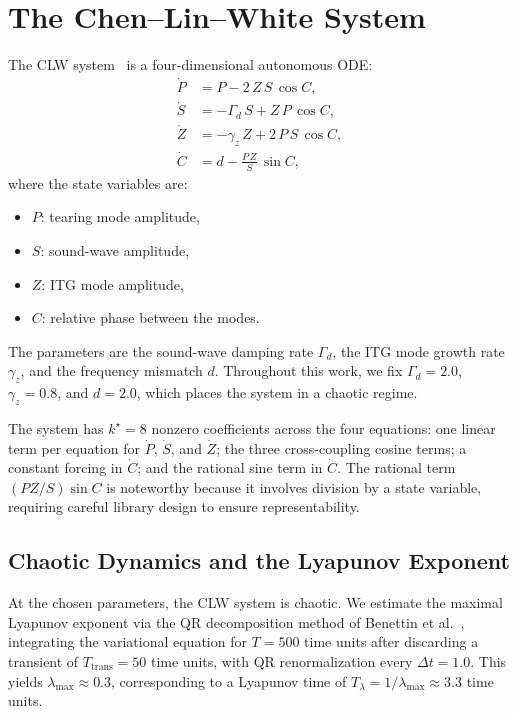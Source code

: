 \documentclass[12pt]{article}
\begin{document}
\section{The Chen--Lin--White System}
\label{sec:system}

The CLW system~\cite{Chen1984} is a four-dimensional autonomous ODE:
\begin{align}
\dot{P} &= P - 2\,Z\,S\,\cos C, \label{eq:clw_P} \\
\dot{S} &= -\Gamma_d\,S + Z\,P\,\cos C, \label{eq:clw_S} \\
\dot{Z} &= -\gamma_z\,Z + 2\,P\,S\,\cos C, \label{eq:clw_Z} \\
\dot{C} &= d - \frac{P\,Z}{S}\,\sin C, \label{eq:clw_C}
\end{align}
where the state variables are:
\begin{itemize}
\item $P$: tearing mode amplitude,
\item $S$: sound-wave amplitude,
\item $Z$: ITG mode amplitude,
\item $C$: relative phase between the modes.
\end{itemize}
The parameters are the sound-wave damping rate $\Gamma_d$, the ITG mode growth rate $\gamma_z$, and the frequency mismatch $d$.
Throughout this work, we fix $\Gamma_d = 2.0$, $\gamma_z = 0.8$, and $d = 2.0$, which places the system in a chaotic regime.

The system has $k^\star = 8$ nonzero coefficients across the four equations: one linear term per equation for $\dot{P}$, $\dot{S}$, and $\dot{Z}$; the three cross-coupling cosine terms; a constant forcing in $\dot{C}$; and the rational sine term in $\dot{C}$.
The rational term $(PZ/S)\sin C$ is noteworthy because it involves division by a state variable, requiring careful library design to ensure representability.

\subsection{Chaotic Dynamics and the Lyapunov Exponent}

At the chosen parameters, the CLW system is chaotic.
We estimate the maximal Lyapunov exponent via the QR decomposition method of Benettin et al.~\cite{Benettin1980}, integrating the variational equation for $T = 500$ time units after discarding a transient of $T_\text{trans} = 50$ time units, with QR renormalization every $\Delta t = 1.0$.
This yields $\lambda_{\max} \approx 0.3$, corresponding to a Lyapunov time of $T_\lambda = 1/\lambda_{\max} \approx 3.3$ time units.
\end{document}
